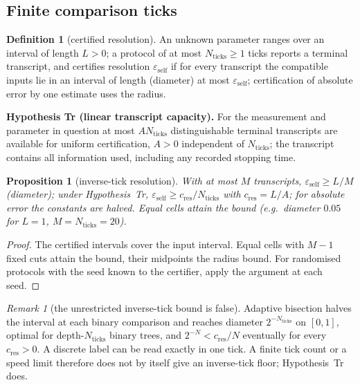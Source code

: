 \documentclass[aps,pra,onecolumn,superscriptaddress,nofootinbib,10pt]{revtex4-2}
\newtheorem{proposition}[theorem]{Proposition}
\theoremstyle{definition}
\newtheorem{definition}[theorem]{Definition}
\theoremstyle{remark}
\newtheorem{remark}[theorem]{Remark}
\begin{document}
\subsection{Finite comparison ticks}\label{sec:soticks}

\begin{definition}[certified resolution]\label{def:sotranscript}
An unknown parameter ranges over an interval of length $L>0$; a protocol of at most $N_{\mathrm{ticks}}\ge1$ ticks reports a
terminal transcript, and certifies resolution $\varepsilon_{\mathrm{self}}$ if for every transcript the compatible inputs lie in
an interval of length (diameter) at most $\varepsilon_{\mathrm{self}}$; certification of absolute error by one estimate uses
the radius.
\end{definition}

\smallskip\noindent\textbf{Hypothesis Tr (linear transcript capacity).}  For the measurement and parameter in question
at most $AN_{\mathrm{ticks}}$ distinguishable terminal transcripts are available for uniform certification, $A>0$ independent
of $N_{\mathrm{ticks}}$; the transcript contains all information used, including any recorded stopping time.

\begin{proposition}[inverse-tick resolution]\label{prop:soresolution}
With at most $M$ transcripts, $\varepsilon_{\mathrm{self}}\ge L/M$ (diameter); under Hypothesis~Tr, $\varepsilon_{\mathrm{self}}\ge c_{\mathrm{res}}/N_{\mathrm{ticks}}$ with
$c_{\mathrm{res}}=L/A$; for absolute error the constants are halved.  Equal cells attain the bound (e.g.\ diameter $0.05$ for
$L=1$, $M=N_{\mathrm{ticks}}=20$).
\end{proposition}
\begin{proof}
The certified intervals cover the input interval.  Equal cells with $M-1$ fixed cuts attain the bound, their
midpoints the radius bound.  For randomised protocols with the seed known to the certifier, apply the
argument at each seed.
\end{proof}

\begin{remark}[the unrestricted inverse-tick bound is false]\label{rem:sobisection}
Adaptive bisection halves the interval at each binary comparison and reaches diameter $2^{-N_{\mathrm{ticks}}}$ on $[0,1]$,
optimal for depth-$N_{\mathrm{ticks}}$ binary trees, and $2^{-N}<c_{\mathrm{res}}/N$ eventually for every $c_{\mathrm{res}}>0$.  A discrete label can be
read exactly in one tick.  A finite tick count or a speed limit therefore does not by itself give an
inverse-tick floor; Hypothesis~Tr does.
\end{remark}
\end{document}
